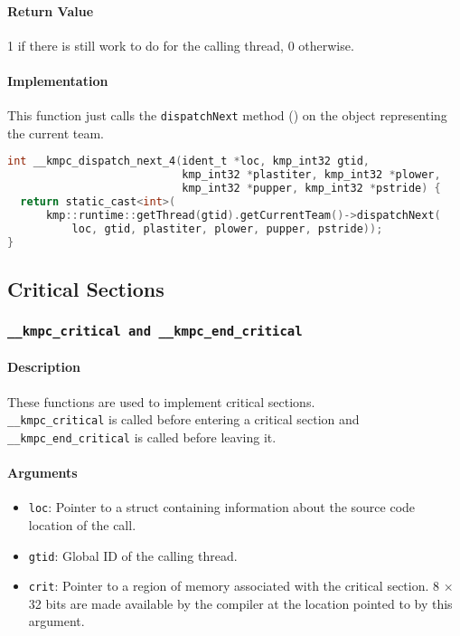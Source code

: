 \paragraph{Return Value} 1 if there is still work to do for the calling thread, 0 otherwise.

\paragraph{Implementation} This function just calls the \texttt{dispatchNext} method () on
the object representing the current team.

\begin{lstlisting}[language=C, caption={__kmpc_dispatch_next_4},
                   label={lst:kmpc-dispatch-next-4}, escapechar=@]
int __kmpc_dispatch_next_4(ident_t *loc, kmp_int32 gtid,
                           kmp_int32 *plastiter, kmp_int32 *plower,
                           kmp_int32 *pupper, kmp_int32 *pstride) {
  return static_cast<int>(
      kmp::runtime::getThread(gtid).getCurrentTeam()->dispatchNext(
          loc, gtid, plastiter, plower, pupper, pstride));
}
\end{lstlisting}

\subsection{Critical Sections}

\subsubsection{\texttt{__kmpc_critical and __kmpc_end_critical}}

\paragraph{Description} These functions are used to implement critical sections.\\
\texttt{\_\_kmpc\_critical} is called before entering a critical section and
\texttt{\_\_kmpc\_end\_critical} is called before leaving it.

\paragraph{Arguments}
\begin{itemize}
	\item \texttt{loc}: Pointer to a struct containing information about the source code location
	      of the call.
	\item \texttt{gtid}: Global ID of the calling thread.
	\item \texttt{crit}: Pointer to a region of memory associated with the critical section. 8
	      $\times$ 32 bits are made available by the compiler at the location pointed to by this
	      argument.
\end{itemize}

